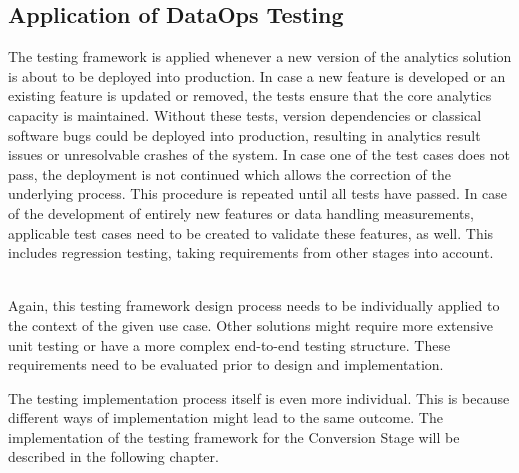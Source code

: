 \subsection{Application of DataOps Testing}
The testing framework is applied whenever a new version of the analytics solution is about to be deployed into production. In case a new feature is developed or an existing feature is updated or removed, the tests ensure that the core analytics capacity is maintained. Without these tests, version dependencies or classical software bugs could be deployed into production, resulting in analytics result issues or unresolvable crashes of the system. In case one of the test cases does not pass, the deployment is not continued which allows the correction of the underlying process. This procedure is repeated until all tests have passed. In case of the development of entirely new features or data handling measurements, applicable test cases need to be created to validate these features, as well. This includes regression testing, taking requirements from other stages into account. \\\

Again, this testing framework design process needs to be individually applied to the context of the given use case. Other solutions might require more extensive unit testing or have a more complex end-to-end testing structure. These requirements need to be evaluated prior to design and implementation.

The testing implementation process itself is even more individual. This is because different ways of implementation might lead to the same outcome. The implementation of the testing framework for the Conversion Stage will be described in the following chapter.
